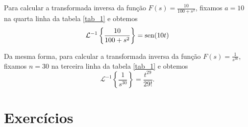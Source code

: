 \begin{ex}Para calcular a transformada inversa da função $F(s)=\frac{10}{100+s^2}$, fixamos $a=10$ na quarta linha da tabela \ref{tab_1} e obtemos
$$
\mathcal{L }^{-1}\left\{ \frac{10}{100+s^2}\right\}=\operatorname{sen}(10t)
$$
\end{ex}
\begin{ex}Da mesma forma, para calcular a transformada inversa da função $F(s)=\frac{1}{s^{30}}$, fixamos $n=30$ na terceira linha da tabela \ref{tab_1} e obtemos
$$
\mathcal{L }^{-1}\left\{ \frac{1}{s^{30}}\right\}=\frac{t^{29}}{29!}.
$$
\end{ex}



\section{Exercícios}
